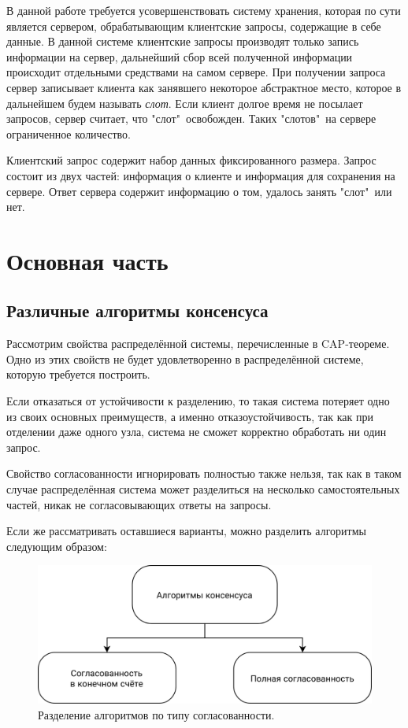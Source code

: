 \documentclass[subf, href, colorlinks=true, 14pt,
times, mtpro, specialist]{disser}
\theoremstyle{definition}
\begin{document}
В данной работе требуется усовершенствовать систему хранения, которая по сути является сервером, обрабатывающим клиентские запросы, содержащие в себе данные. В данной системе клиентские запросы производят только запись информации на сервер, дальнейший сбор всей полученной информации происходит отдельными средствами на самом сервере. При получении запроса сервер записывает клиента как занявшего некоторое абстрактное место, которое в дальнейшем будем называть \emph{слот}. Если клиент долгое время не посылает запросов, сервер считает, что "слот"\ освобожден. Таких "слотов"\ на сервере ограниченное количество.

Клиентский запрос содержит набор данных фиксированного размера. Запрос состоит из двух частей: информация о клиенте и информация для сохранения на сервере. Ответ сервера содержит информацию о том, удалось занять "слот"\ или нет.

\newpage
\section{Основная часть}

\subsection{Различные алгоритмы консенсуса}

Рассмотрим свойства распределённой системы, перечисленные в CAP-теореме. Одно из этих свойств не будет удовлетворенно в распределённой системе, которую требуется построить. 

Если отказаться от устойчивости к разделению, то такая система потеряет одно из своих основных преимуществ, а именно отказоустойчивость, так как при отделении даже одного узла, система не сможет корректно обработать ни один запрос.

Свойство согласованности игнорировать полностью также нельзя, так как в таком случае распределённая система может разделиться на несколько самостоятельных частей, никак не согласовывающих ответы на запросы. 

Если же рассматривать оставшиеся варианты, можно разделить алгоритмы следующим образом:

\begin{figure}[H]
\centering
\includegraphics[width=1\textwidth]{src/pics/consensus_types_1.png}
\caption{Разделение алгоритмов по типу согласованности.}
\label{fig:consensus_types_1}
\end{figure}
\end{document}
